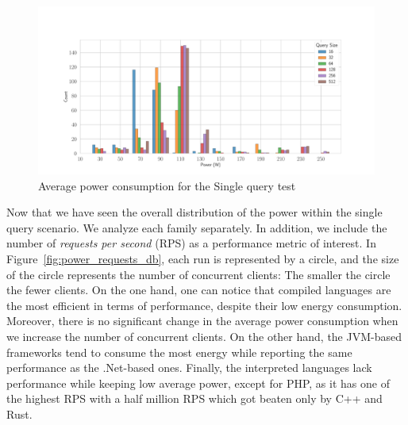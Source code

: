 \begin{figure}[hbt]
    \centering
    \includegraphics[width=\textwidth,height=\textheight,keepaspectratio]{imgs/histogram_av_power_cpu_db}
    \caption{Average power consumption for the Single query test }
    \label{fig:av_power_db}
\end{figure}

Now that we have seen the overall distribution of the power within the single query scenario.
We analyze each family separately.
In addition, we include the number of \emph{requests per second} (RPS) as a performance metric of interest.
In Figure~\ref{fig:power_requests_db}, each run is represented by a circle, and the size of the circle represents the number of concurrent clients: The smaller the circle the fewer clients.
On the one hand, one can notice that compiled languages are the most efficient in terms of performance, despite their low energy consumption.
Moreover, there is no significant change in the average power consumption when we increase the number of concurrent clients.
On the other hand, the JVM-based frameworks tend to consume the most energy while reporting the same performance as the .Net-based ones.
Finally, the interpreted languages lack performance while keeping low average power, except for PHP, as it has one of the highest RPS with a half million RPS which got beaten only by C++ and Rust.

